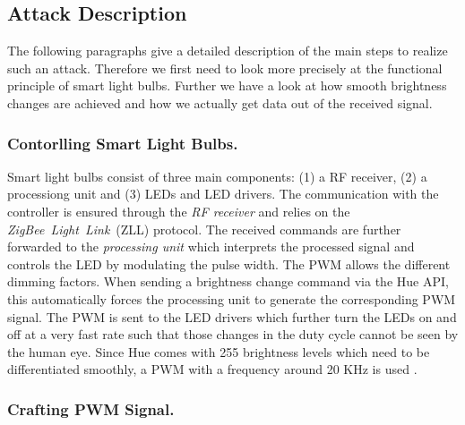 \subsection{Attack Description} %
\label{sec:exp:description}


The following paragraphs give a detailed description of the main steps to realize such an attack. Therefore we first need to look more precisely at the functional principle of smart light bulbs. Further we have a look at how smooth brightness changes are achieved and how we actually get data out of the received signal.\newline



\subsubsection{Contorlling Smart Light Bulbs.} 
Smart light bulbs consist of three main components: (1) a RF receiver, (2) a processiong unit and (3) LEDs and LED drivers.
The communication with the controller is ensured through the \textit{RF receiver} and relies on the \textit{ZigBee~Light~Link}~(ZLL) protocol. The received commands are further forwarded to the \textit{processing unit} which interprets the processed signal and controls the LED by modulating the pulse width. The PWM allows the different dimming factors. When sending a brightness change command via the Hue API, this automatically forces the processing unit to generate the corresponding PWM signal. The PWM is sent to the LED drivers which further turn the LEDs on and off at a very fast rate such that those changes in the duty cycle cannot be seen by the human eye. Since Hue comes with 255 brightness levels which need to be differentiated smoothly, a PWM with a frequency around 20 KHz is used \cite{Ronen:2016:EFAIDCSL}. 

\subsubsection{Crafting PWM Signal.}

